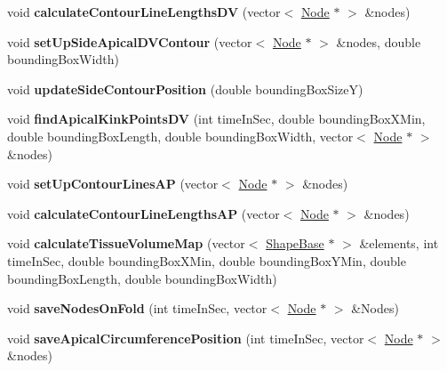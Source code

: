 \begin{DoxyCompactItemize}
\item 
\hypertarget{classAnalysis_ae0cee6d9db2340652610f24edae9e831}{}void {\bfseries calculate\+Contour\+Line\+Lengths\+D\+V} (vector$<$ \hyperlink{classNode}{Node} $\ast$ $>$ \&nodes)\label{classAnalysis_ae0cee6d9db2340652610f24edae9e831}

\item 
\hypertarget{classAnalysis_a31c9d5b9ff7cddb6e151e5e8b960b1cd}{}void {\bfseries set\+Up\+Side\+Apical\+D\+V\+Contour} (vector$<$ \hyperlink{classNode}{Node} $\ast$ $>$ \&nodes, double bounding\+Box\+Width)\label{classAnalysis_a31c9d5b9ff7cddb6e151e5e8b960b1cd}

\item 
\hypertarget{classAnalysis_af9b316dcc9cb5f903371ab91706b41d1}{}void {\bfseries update\+Side\+Contour\+Position} (double bounding\+Box\+Size\+Y)\label{classAnalysis_af9b316dcc9cb5f903371ab91706b41d1}

\item 
\hypertarget{classAnalysis_ab268f8b8b4c0f433a42cbbe529bdb40b}{}void {\bfseries find\+Apical\+Kink\+Points\+D\+V} (int time\+In\+Sec, double bounding\+Box\+X\+Min, double bounding\+Box\+Length, double bounding\+Box\+Width, vector$<$ \hyperlink{classNode}{Node} $\ast$ $>$ \&nodes)\label{classAnalysis_ab268f8b8b4c0f433a42cbbe529bdb40b}

\item 
\hypertarget{classAnalysis_a4ec2bc25bacfc32923a8b77e17db2924}{}void {\bfseries set\+Up\+Contour\+Lines\+A\+P} (vector$<$ \hyperlink{classNode}{Node} $\ast$ $>$ \&nodes)\label{classAnalysis_a4ec2bc25bacfc32923a8b77e17db2924}

\item 
\hypertarget{classAnalysis_a86e13c80def0f70cc26b41a33275aef2}{}void {\bfseries calculate\+Contour\+Line\+Lengths\+A\+P} (vector$<$ \hyperlink{classNode}{Node} $\ast$ $>$ \&nodes)\label{classAnalysis_a86e13c80def0f70cc26b41a33275aef2}

\item 
\hypertarget{classAnalysis_a91a6753322819e3fde1fc36e8ebc1548}{}void {\bfseries calculate\+Tissue\+Volume\+Map} (vector$<$ \hyperlink{classShapeBase}{Shape\+Base} $\ast$ $>$ \&elements, int time\+In\+Sec, double bounding\+Box\+X\+Min, double bounding\+Box\+Y\+Min, double bounding\+Box\+Length, double bounding\+Box\+Width)\label{classAnalysis_a91a6753322819e3fde1fc36e8ebc1548}

\item 
\hypertarget{classAnalysis_af997396e30dce4aca35b2154e7e6f852}{}void {\bfseries save\+Nodes\+On\+Fold} (int time\+In\+Sec, vector$<$ \hyperlink{classNode}{Node} $\ast$ $>$ \&Nodes)\label{classAnalysis_af997396e30dce4aca35b2154e7e6f852}

\item 
\hypertarget{classAnalysis_a5e7b6a2a646eafb36f13c3c78e84c520}{}void {\bfseries save\+Apical\+Circumference\+Position} (int time\+In\+Sec, vector$<$ \hyperlink{classNode}{Node} $\ast$ $>$ \&nodes)\label{classAnalysis_a5e7b6a2a646eafb36f13c3c78e84c520}

\end{DoxyCompactItemize}
